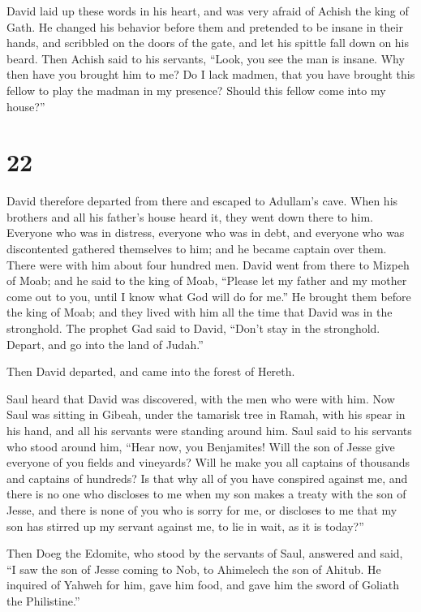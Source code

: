  David laid up these words in his heart, and was very
afraid of Achish the king of Gath.  He changed his
behavior before them and pretended to be insane in their hands, and
scribbled on the doors of the gate, and let his spittle fall down on his
beard.  Then Achish said to his servants, ``Look, you see
the man is insane. Why then have you brought him to me? 
Do I lack madmen, that you have brought this fellow to play the madman
in my presence? Should this fellow come into my house?''

\hypertarget{section-21}{%
\section{22}\label{section-21}}

 David therefore departed from there and escaped to
Adullam's cave. When his brothers and all his father's house heard it,
they went down there to him.  Everyone who was in
distress, everyone who was in debt, and everyone who was discontented
gathered themselves to him; and he became captain over them. There were
with him about four hundred men.  David went from there to
Mizpeh of Moab; and he said to the king of Moab, ``Please let my father
and my mother come out to you, until I know what God will do for me.''
 He brought them before the king of Moab; and they lived
with him all the time that David was in the stronghold. 
The prophet Gad said to David, ``Don't stay in the stronghold. Depart,
and go into the land of Judah.''

Then David departed, and came into the forest of Hereth.

 Saul heard that David was discovered, with the men who
were with him. Now Saul was sitting in Gibeah, under the tamarisk tree
in Ramah, with his spear in his hand, and all his servants were standing
around him.  Saul said to his servants who stood around
him, ``Hear now, you Benjamites! Will the son of Jesse give everyone of
you fields and vineyards? Will he make you all captains of thousands and
captains of hundreds?  Is that why all of you have
conspired against me, and there is no one who discloses to me when my
son makes a treaty with the son of Jesse, and there is none of you who
is sorry for me, or discloses to me that my son has stirred up my
servant against me, to lie in wait, as it is today?''

 Then Doeg the Edomite, who stood by the servants of Saul,
answered and said, ``I saw the son of Jesse coming to Nob, to Ahimelech
the son of Ahitub.  He inquired of Yahweh for him, gave
him food, and gave him the sword of Goliath the Philistine.''

